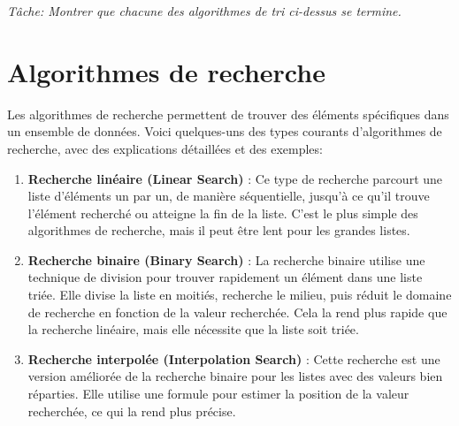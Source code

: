 \textit{T\^ache: Montrer que chacune des algorithmes de tri ci-dessus se termine.
}

\section{Algorithmes de recherche}

Les algorithmes de recherche permettent de trouver des éléments spécifiques dans un ensemble de données. Voici quelques-uns des types courants d'algorithmes de recherche, avec des explications détaillées et des exemples:

\begin{enumerate}
	\item \textbf{Recherche linéaire (Linear Search)} : Ce type de recherche parcourt une liste d'éléments un par un, de manière séquentielle, jusqu'à ce qu'il trouve l'élément recherché ou atteigne la fin de la liste. C'est le plus simple des algorithmes de recherche, mais il peut être lent pour les grandes listes.
	

	\item \textbf{Recherche binaire (Binary Search)} : La recherche binaire utilise une technique de division pour trouver rapidement un élément dans une liste triée. Elle divise la liste en moitiés, recherche le milieu, puis réduit le domaine de recherche en fonction de la valeur recherchée. Cela la rend plus rapide que la recherche linéaire, mais elle nécessite que la liste soit triée.
	
	
	
%	
	
	\item \textbf{Recherche interpolée (Interpolation Search)} : Cette recherche est une version améliorée de la recherche binaire pour les listes avec des valeurs bien réparties. Elle utilise une formule pour estimer la position de la valeur recherchée, ce qui la rend plus précise.
	

\end{enumerate}
